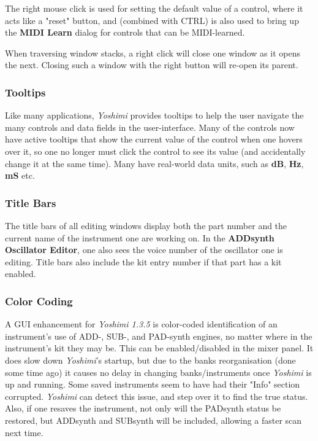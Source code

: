     The right mouse click is used for setting the default value of a control,
    where it acts like a "reset" button, and (combined with CTRL) is also
    used to bring up the \textbf{MIDI Learn} dialog for controls that can be
    MIDI-learned.

   When traversing window stacks, a right click will close one window as it
   opens the next. Closing such a window with the right button will re-open its
   parent.

\subsubsection{Tooltips}
\label{subsubsec:stock_settings_tooltips}

   Like many applications, \textsl{Yoshimi} provides tooltips to help the user
   navigate the many controls and data fields in the user-interface.  Many of
   the controls now have active tooltips that show the current value of the
   control when one hovers over it, so one no longer must click the control to
   see its value (and accidentally change it at the same time). Many have
   real-world data units, such as \textbf{dB}, \textbf{Hz}, \textbf{mS} etc.

\subsubsection{Title Bars}
\label{subsubsec:stock_settings_elements_title_bars}

   The title bars of all editing windows display both the part number and the
   current name of the instrument one are working on.  In the
   \textbf{ADDsynth Oscillator Editor}, one also sees the
   voice number of the oscillator one is editing.
   Title bars also include the kit entry number if that part has a kit enabled.

\subsubsection{Color Coding}
\label{subsubsec:stock_settings_elements_color_coding}

   A GUI enhancement for \textsl{Yoshimi 1.3.5} is color-coded identification
   of an instrument's use of ADD-, SUB-, and PAD-synth engines, no matter where
   in the instrument's kit they may be. This can be enabled/disabled in the
   mixer panel. It does slow down \textsl{Yoshimi}'s startup, but due to the
   banks reorganisation (done some time ago) it causes no delay in changing
   banks/instruments once \textsl{Yoshimi} is up and running.  Some saved
   instruments seem to have had their "Info" section corrupted.
   \textsl{Yoshimi} can detect this issue, and step over it to find the true
   status. Also, if one resaves the instrument, not only will the PADsynth
   status be restored, but ADDsynth and SUBsynth will be included, allowing a
   faster scan next time.


